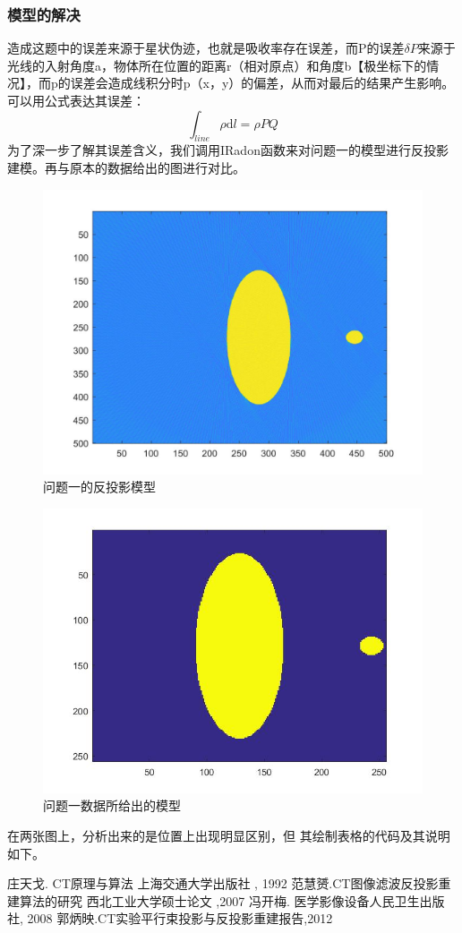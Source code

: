 \documentclass[withoutpreface,bwprint]{cumcmthesis} %
\begin{document}
\subsubsection {模型的解决}
造成这题中的误差来源于星状伪迹，也就是吸收率存在误差，而P的误差$\delta P$来源于
光线的入射角度a，物体所在位置的距离r（相对原点）和角度b【极坐标下的情况】，而p的误差会造成线积分时p（x，y）的偏差，从而对最后的结果产生影响。
可以用公式表达其误差：
\begin{equation}
\int_{line}{\rho}\mathrm{d}l={\rho}PQ
\end{equation}
为了深一步了解其误差含义，我们调用IRadon函数来对问题一的模型进行反投影建模。再与原本的数据给出的图进行对比。
\begin{figure}[H]
\centering
\includegraphics[width=.6\textwidth]{6.jpg}
\caption{问题一的反投影模型}
\end{figure}

\begin{figure}[H]
\centering
\includegraphics[width=.6\textwidth]{9.jpg}
\caption{问题一数据所给出的模型}
\end{figure}
在两张图上，分析出来的是位置上出现明显区别，但
其绘制表格的代码及其说明如下。


 
\begin{thebibliography}{9}%
  庄天戈. CT原理与算法  上海交通大学出版社 , 1992
  范慧赟.CT图像滤波反投影重建算法的研究  西北工业大学硕士论文 ,2007
  冯开梅. 医学影像设备人民卫生出版社, 2008
   郭炳映.CT实验平行束投影与反投影重建报告,2012
\end{thebibliography}
\end{document}
